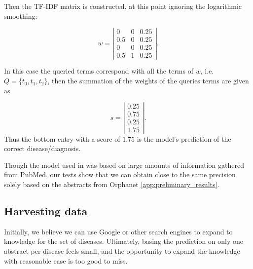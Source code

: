 \documentclass[10pt,letterpaper,final]{article}
\begin{document}
Then the TF-IDF matrix is constructed, at this point ignoring the
logarithmic smoothing:

\[ w = \left| \begin{array}{ccc}
0 & 0 & 0.25 \\
0.5 & 0 & 0.25 \\
0 & 0 & 0.25 \\
0.5 & 1 & 0.25  \end{array} \right|.
\]

In this case the queried terms correspond with all the terms of
$w$, i.e. $Q = \{t_{0}, t_{1}, t_{2}\}$, then the summation of the
weights of the queries terms are given as

\[ s = \left| \begin{array}{c}
0.25 \\
0.75 \\
0.25 \\
1.75 \end{array} \right|.
\]
Thus the bottom entry with a score of $1.75$ is the model's prediction
of the correct disease/diagnosis. \newline

Though the model used in \cite{jensenandersen} was based on large
amounts of information gathered from PubMed, our tests show that we
can obtain close to the same precision solely based on the abstracts
from Orphanet \ref{app:preliminary_results}.



\subsection{Harvesting data}
Initially, we believe we can use Google or other search engines to
expand to knowledge for the set of diseases. Ultimately, basing the
prediction on only one abstract per disease feels small, and the
opportunity to expand the knowledge with reasonable ease is too good to
miss.
\end{document}
